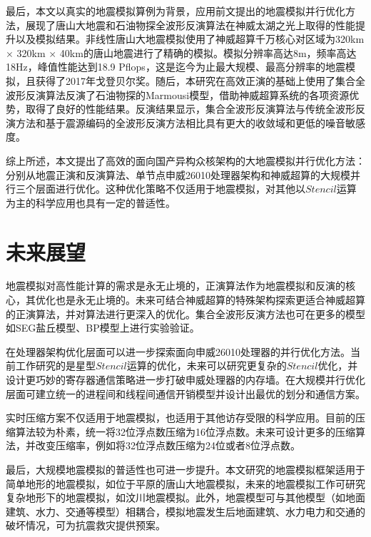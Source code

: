 最后，本文以真实的地震模拟算例为背景，应用前文提出的地震模拟并行优化方法，展现了唐山大地震和石油物探全波形反演算法在神威太湖之光上取得的性能提升以及模拟结果。非线性唐山大地震模拟使用了神威超算千万核心对区域为320km $\times$ 320km $\times$ 40km的唐山地震进行了精确的模拟。模拟分辨率高达8m，频率高达18Hz，峰值性能达到18.9 Pflops，这是迄今为止最大规模、最高分辨率的地震模拟，且获得了2017年戈登贝尔奖。随后，本研究在高效正演的基础上使用了集合全波形反演算法反演了石油物探的Marmousi模型，借助神威超算系统的各项资源优势，取得了良好的性能结果。反演结果显示，集合全波形反演算法与传统全波形反演方法和基于震源编码的全波形反演方法相比具有更大的收敛域和更低的噪音敏感度。

综上所述，本文提出了高效的面向国产异构众核架构的大地震模拟并行优化方法：分别从地震正演和反演算法、单节点申威26010处理器架构和神威超算的大规模并行三个层面进行优化。这种优化策略不仅适用于地震模拟，对其他以$Stencil$运算为主的科学应用也具有一定的普适性。

\section{未来展望}

地震模拟对高性能计算的需求是永无止境的，正演算法作为地震模拟和反演的核心，其优化也是永无止境的。未来可结合神威超算的特殊架构探索更适合神威超算的正演算法，并对算法进行更深入的优化。集合全波形反演方法也可在更多的模型如SEG盐丘模型、BP模型上进行实验验证。

在处理器架构优化层面可以进一步探索面向申威26010处理器的并行优化方法。当前工作研究的是星型$Stencil$运算的优化，未来可以研究更复杂的$Stencil$优化，并设计更巧妙的寄存器通信策略进一步打破申威处理器的内存墙。在大规模并行优化层面可建立统一的进程间和线程间通信开销模型并设计出最优的划分和通信方案。

实时压缩方案不仅适用于地震模拟，也适用于其他访存受限的科学应用。目前的压缩算法较为朴素，统一将32位浮点数压缩为16位浮点数。未来可设计更多的压缩算法，并改变压缩率，例如将32位浮点数压缩为24位或者8位浮点数。

最后，大规模地震模拟的普适性也可进一步提升。本文研究的地震模拟框架适用于简单地形的地震模拟，如位于平原的唐山大地震模拟，未来的地震模拟工作可研究复杂地形下的地震模拟，如汶川地震模拟。此外，地震模型可与其他模型（如地面建筑、水力、交通等模型）相耦合，模拟地震发生后地面建筑、水力电力和交通的破坏情况，可为抗震救灾提供预案。

